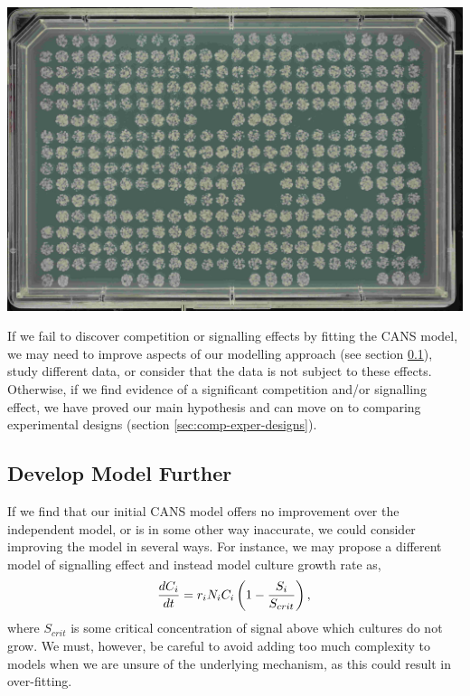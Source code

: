 \begin{Figure}
  \centering
  \includegraphics[width=\linewidth]{DLR00012647-2009-07-02_23-12-49}
  \label{fig:gaps}
\end{Figure}

If we fail to discover competition or signalling effects by fitting
the CANS model, we may need to improve aspects of our modelling
approach (see section \ref{sec:dev-mod-further}), study different
data, or consider that the data is not subject to these
effects. Otherwise, if we find evidence of a significant competition
and/or signalling effect, we have proved our main hypothesis and can
move on to comparing experimental designs (section
\ref{sec:comp-exper-designs}).

\subsection{Develop Model Further}
\label{sec:dev-mod-further}
If we find that our initial CANS model offers no improvement over the
independent model, or is in some other way inaccurate, we could
consider improving the model in several ways. For instance, we may
propose a different model of signalling effect and instead model
culture growth rate as,
\begin{equation}
  \label{eq:7}
  \frac{dC_{i}}{dt} = r_{i}N_{i}C_{i}\left(1 - \frac{S_{i}}{S_{crit}}\right),\\
\end{equation}
where \(S_{crit}\) is some critical concentration of signal above
which cultures do not grow. We must, however, be careful to avoid
adding too much complexity to models when we are unsure of the
underlying mechanism, as this could result in over-fitting.

